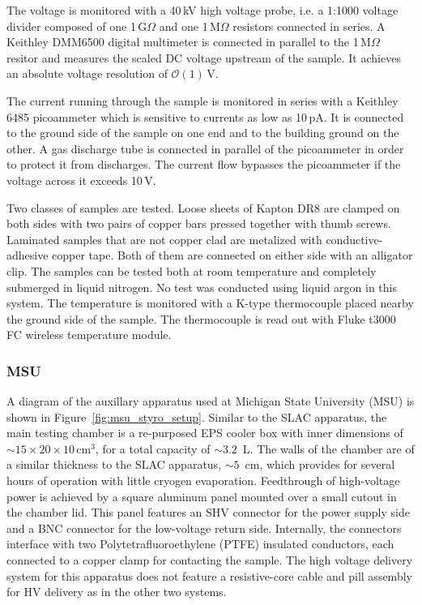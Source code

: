 \documentclass[a4paper,12pt]{article}
\begin{document}
The voltage is monitored with a 40\,kV high voltage probe, i.e. a 1:1000 voltage divider composed of one 1\,G$\Omega$ and one 1\,M$\Omega$ resistors connected in series. A Keithley DMM6500 digital multimeter is connected in parallel to the 1\,M$\Omega$ resitor and measures the scaled DC voltage upstream of the sample. It achieves an absolute voltage resolution of $\mathcal{O}(1)\,$V.

The current running through the sample is monitored in series with a Keithley 6485 picoammeter which is sensitive to currents as low as 10\,pA. It is connected to the ground side of the sample on one end and to the building ground on the other. A gas discharge tube is connected in parallel of the picoammeter in order to protect it from discharges. The current flow bypasses the picoammeter if the voltage across it exceeds 10\,V.

Two classes of samples are tested. Loose sheets of Kapton DR8 are clamped on both sides with two pairs of copper bars pressed together with thumb screws. Laminated samples that are not copper clad are metalized with conductive-adhesive copper tape. Both of them are connected on either side with an alligator clip. The samples can be tested both at room temperature and completely submerged in liquid nitrogen. No test was conducted using liquid argon in this system. The temperature is monitored with a K-type thermocouple placed nearby the ground side of the sample. The thermocouple is read out with Fluke t3000 FC wireless temperature module.

\subsubsection{MSU}
\label{sec:MSU}

A diagram of the auxillary apparatus used at Michigan State University (MSU) is shown in Figure~\ref{fig:msu_styro_setup}.  Similar to the SLAC apparatus, the main testing chamber is a re-purposed EPS cooler box with inner dimensions of $\sim 15 \times 20 \times 10\,$cm$^3$, for a total capacity of $\sim 3.2\,$ L.  The walls of the chamber are of a similar thickness to the SLAC apparatus, $\sim 5\,$ cm, which provides for several hours of operation with little cryogen evaporation.  Feedthrough of high-voltage power is achieved by a square aluminum panel mounted over a small cutout in the chamber lid.  This panel features an SHV connector for the power supply side and a BNC connector for the low-voltage return side.  Internally, the connectors interface with two Polytetrafluoroethylene (PTFE) insulated conductors, each connected to a copper clamp for contacting the sample.  The high voltage delivery system for this apparatus does not feature a resistive-core cable and pill assembly for HV delivery as in the other two systems.
\end{document}
